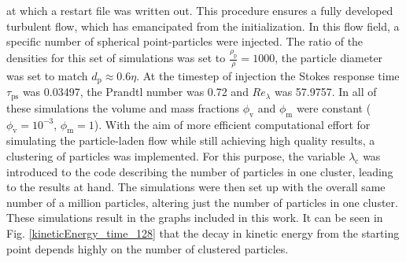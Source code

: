 \documentclass[11pt,a4paper,openany,oneside,parskip=half*]{article}
\begin{document}
at which a restart file was written out. This procedure ensures a fully developed turbulent 
flow, which has emancipated from the initialization. In this flow field, a specific number of spherical point-particles were injected. 
\newline
The ratio of the densities for this set of simulations was set to $\frac{\rho_\mathrm{p}}{\rho} = 1000$, the particle diameter was set to match $d_\mathrm{p} \approx 0.6 \eta$. At the timestep of injection the Stokes response time $\tau_\mathrm{ps}$ was 0.03497, the Prandtl number was 0.72 and $Re_\lambda$ was 57.9757. In all of these simulations the volume and mass fractions $\phi_\mathrm{v}$ and $\phi_\mathrm{m}$ were constant ($\phi_\mathrm{v}= 10^{-3}$, $\phi_\mathrm{m}=1$). 
\newline
With the aim of more efficient computational effort for simulating the particle-laden flow while still achieving high quality results, a clustering of particles was implemented. For this purpose, the variable $\lambda_\mathrm{c}$ was introduced to the code describing the number of particles in one cluster, leading to the results at hand. The simulations were then set up with the overall same number of  a million particles, altering just the number of particles in one cluster. These simulations result in the graphs included in this work. 
It can be seen in Fig. \ref{kineticEnergy_time_128} that the decay in kinetic energy from the starting point depends highly on the number of clustered particles.
\end{document}
